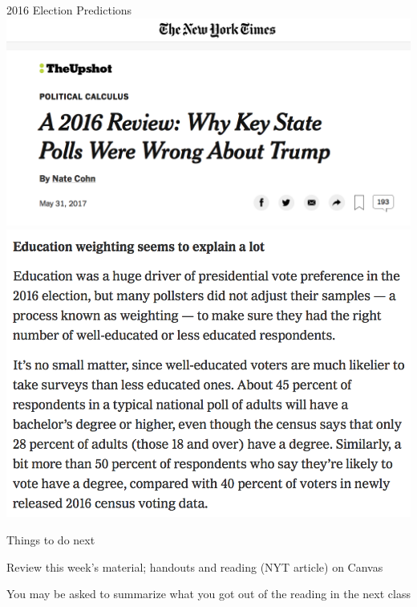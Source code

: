 \documentclass{./../div_teaching_slides}
\begin{document}
\begin{frame}{2016 Election Predictions}
\centering
 \includegraphics[scale=0.14]{nyt2.png} \\
\includegraphics[scale=0.19]{nyt.png} \\
\end{frame}


\begin{frame}{Things to do next}
\begin{witemize}
\item Review this week's material; handouts and reading (NYT article) on Canvas
\item You may be asked to summarize what you got out of the reading in the next class
\end{witemize}
\end{frame}
\end{document}
